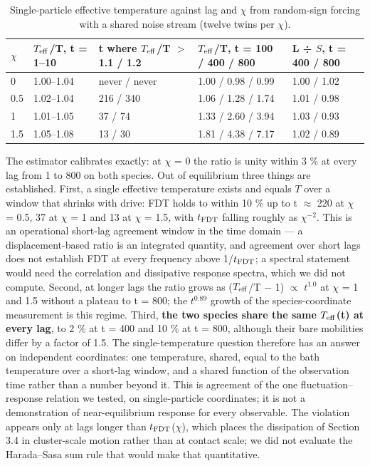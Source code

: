 \documentclass[aps,pre,preprint,superscriptaddress,nofootinbib,longbibliography]{revtex4-2}
\begin{document}
\begin{table}[htbp]
\caption{Single-particle effective temperature against lag and $\chi$ from random-sign forcing with a shared noise stream (twelve twins per $\chi$).}
\label{tab:16}
\begin{ruledtabular}
\begin{tabular}{p{1.34cm}p{2.80cm}p{3.34cm}p{3.29cm}p{2.57cm}}
\raggedright
$\chi$ & $T_{\rm eff}$/T, t = 1--10 & t where $T_{\rm eff}$/T $>$ 1.1 / 1.2 & $T_{\rm eff}$/T, t = 100 / 400 / 800 & L ÷ $S$, t = 400 / 800 \\
\hline
0 & 1.00--1.04 & never / never & 1.00 / 0.98 / 0.99 & 1.00 / 1.02 \\
0.5 & 1.02--1.04 & 216 / 340 & 1.06 / 1.28 / 1.74 & 1.01 / 0.98 \\
1 & 1.01--1.05 & 37 / 74 & 1.33 / 2.60 / 3.94 & 1.03 / 0.93 \\
1.5 & 1.05--1.08 & 13 / 30 & 1.81 / 4.38 / 7.17 & 1.02 / 0.89 \\
\end{tabular}
\end{ruledtabular}
\end{table}

The estimator calibrates exactly: at $\chi$ = 0 the ratio is unity within 3 \% at every lag from 1 to 800 on both species. Out of equilibrium three things are established. First, a single effective temperature exists and equals $T$ over a window that shrinks with drive: FDT holds to within 10 \% up to t $\approx$ 220 at $\chi$ = 0.5, 37 at $\chi$ = 1 and 13 at $\chi$ = 1.5, with $t_{\rm FDT}$ falling roughly as $\chi ^{-2}$. This is an operational short-lag agreement window in the time domain --- a displacement-based ratio is an integrated quantity, and agreement over short lags does not establish FDT at every frequency above 1/$t_{\rm FDT}$; a spectral statement would need the correlation and dissipative response spectra, which we did not compute. Second, at longer lags the ratio grows as ($T_{\rm eff}$/T $-$ 1) $\propto$ $t^{1.0}$ at $\chi$ = 1 and 1.5 without a plateau to t = 800; the $t^{0.89}$ growth of the species-coordinate measurement is this regime. Third, \textbf{the two species share the same $T_{\rm eff}$(t) at every lag}, to 2 \% at t = 400 and 10 \% at t = 800, although their bare mobilities differ by a factor of 1.5. The single-temperature question therefore has an answer on independent coordinates: one temperature, shared, equal to the bath temperature over a short-lag window, and a shared function of the observation time rather than a number beyond it. This is agreement of the one fluctuation--response relation we tested, on single-particle coordinates; it is not a demonstration of near-equilibrium response for every observable. The violation appears only at lags longer than $t_{\rm FDT}$($\chi$), which places the dissipation of Section 3.4 in cluster-scale motion rather than at contact scale; we did not evaluate the Harada--Sasa sum rule that would make that quantitative.
\end{document}
